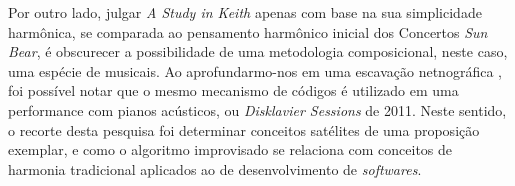 Por outro lado, julgar \emph{A Study in Keith} apenas com base na sua simplicidade harmônica, se comparada ao pensamento harmônico inicial dos Concertos \emph{Sun Bear}, é obscurecer a possibilidade de uma metodologia composicional, neste caso, uma espécie de  musicais. Ao aprofundarmo-nos em uma escavação netnográfica \cite{mori_analysing_2015}, foi possível notar que o mesmo mecanismo de códigos é utilizado em uma performance com pianos acústicos, ou \emph{Disklavier Sessions} de 2011. Neste sentido, o recorte desta pesquisa foi determinar conceitos satélites de uma proposição exemplar, e como o algoritmo improvisado se relaciona com conceitos de harmonia tradicional aplicados ao de desenvolvimento de \emph{softwares}.


